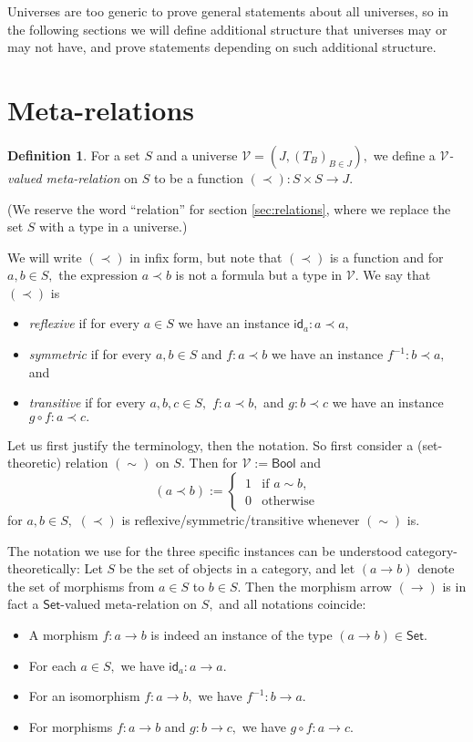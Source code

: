 \documentclass[a4paper]{article}
\theoremstyle{definition}
\newtheorem{definition}{Definition}[section]
\theoremstyle{remark}
\newcommand{\defn}{\emph}
\newcommand{\V}{\mathcal{V}}
\newcommand{\nm}{\mathsf}
\newcommand{\universe}{\nm}
\newcommand{\Bool}{\universe{Bool}}
\newcommand{\Set}{\universe{Set}}
\newcommand{\id}{\nm{id}}
\begin{document}
Universes are too generic to prove general statements about all universes, so in the following sections
we will define additional structure that universes may or may not have, and prove statements depending
on such additional structure.

\section{Meta-relations}
\label{sec:meta-relations}

\begin{definition}
  For a set $S$ and a universe $\V = (J, (T_B)_{B \in J}),$ we define a \defn{$\V$-valued meta-relation}
  on $S$ to be a function $(\prec) : S \times S \to J.$
\end{definition}

(We reserve the word ``relation'' for section \ref{sec:relations}, where we replace the set $S$ with a type
in a universe.)

We will write $(\prec)$ in infix form, but note that $(\prec)$ is a function and for $a,b \in S,$ the
expression $a \prec b$ is not a formula but a type in $\V.$
We say that $(\prec)$ is
\begin{itemize}
  \item \defn{reflexive} if for every $a \in S$ we have an instance $\id_a : a \prec a,$
  \item \defn{symmetric} if for every $a,b \in S$ and $f : a \prec b$ we have an instance
  $f^{-1} : b \prec a,$ and
  \item \defn{transitive} if for every $a,b,c \in S,$ $f : a \prec b,$ and $g : b \prec c$ we have an
  instance $g \circ f : a \prec c.$
\end{itemize}

Let us first justify the terminology, then the notation. So first consider a (set-theoretic) relation
$(\sim)$ on $S.$ Then for $\V := \Bool$ and
\[(a \prec b) := \begin{cases}
  \, 1 & \text{if } a \sim b,\\
  \, 0 & \text{otherwise}
\end{cases}\]
for $a,b \in S,$ $(\prec)$ is reflexive/symmetric/transitive whenever $(\sim)$ is.

The notation we use for the three specific instances can be understood category-theoretically:
Let $S$ be the set of objects in a category, and let $(a \to b)$ denote the set of morphisms
from $a \in S$ to $b \in S.$ Then the morphism arrow $(\to)$ is in fact a $\Set$-valued
meta-relation on $S,$ and all notations coincide:
\begin{itemize}
  \item A morphism $f : a \to b$ is indeed an instance of the type $(a \to b) \in \Set.$
  \item For each $a \in S,$ we have $\id_a : a \to a.$
  \item For an isomorphism $f : a \to b,$ we have $f^{-1} : b \to a.$
  \item For morphisms $f : a \to b$ and $g : b \to c,$ we have $g \circ f : a \to c.$
\end{itemize}
\end{document}
